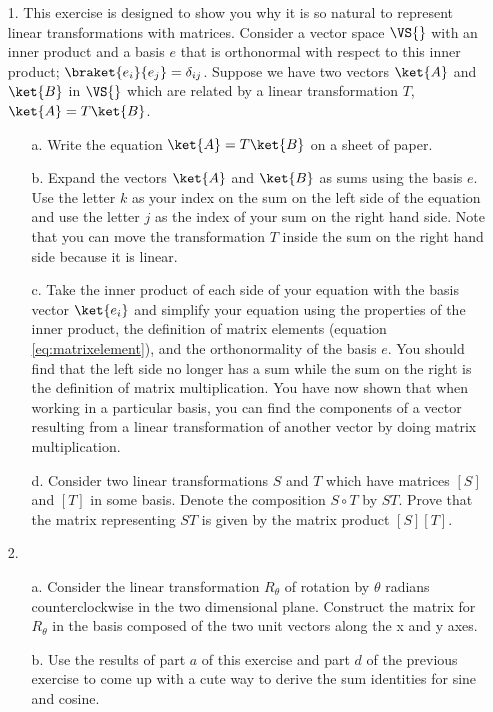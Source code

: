 \begin{itemize}
  \item[1.] This exercise is designed to show you why it is so natural to represent linear transformations with matrices.  Consider a vector space $\VS{}$ with an inner product and a basis $e$ that is orthonormal with respect to this inner product; $\braket{e_i}{e_j}=\delta_{ij}$.  Suppose we have two vectors $\ket{A}$ and $\ket{B}$ in $\VS{}$ which are related by a linear transformation $T$, \mbox{$\ket{A} = T\ket{B}$.}
  \begin{itemize}
    \item[a.] Write the equation $\ket{A} = T\ket{B}$ on a sheet of paper.
    \item[b.] Expand the vectors $\ket{A}$ and $\ket{B}$ as sums using the basis $e$.
      Use the letter $k$ as your index on the sum on the left side of the equation and use the letter $j$ as the index of your sum on the right hand side.
      Note that you can move the transformation $T$ inside the sum on the right hand side because it is linear.
    \item[c.] Take the inner product of each side of your equation with the basis vector $\ket{e_i}$ and simplify your equation using the properties of the inner product, the definition of matrix elements (equation \ref{eq:matrixelement}), and the orthonormality of the basis $e$.
      You should find that the left side no longer has a sum while the sum on the right is the definition of matrix multiplication.
      You have now shown that when working in a particular basis, you can find the components of a vector resulting from a linear transformation of another vector by doing matrix multiplication.
    \item[d.] Consider two linear transformations $S$ and $T$ which have matrices $[S]$ and $[T]$ in some basis.
      Denote the composition $S \circ T$ by $ST$.
      Prove that the matrix representing $ST$ is given by the matrix product $[S][T]$.
  \end{itemize}
  \item[2.]
    \begin{itemize}
      \item[a.] Consider the linear transformation $R_{\theta}$ of rotation by $\theta$ radians counterclockwise in the two dimensional plane.
        Construct the matrix for $R_{\theta}$ in the basis composed of the two unit vectors along the x and y axes.
      \item[b.] Use the results of part $a$ of this exercise and part $d$ of the previous exercise to come up with a cute way to derive the sum identities for sine and cosine.
    \end{itemize}
\end{itemize}

